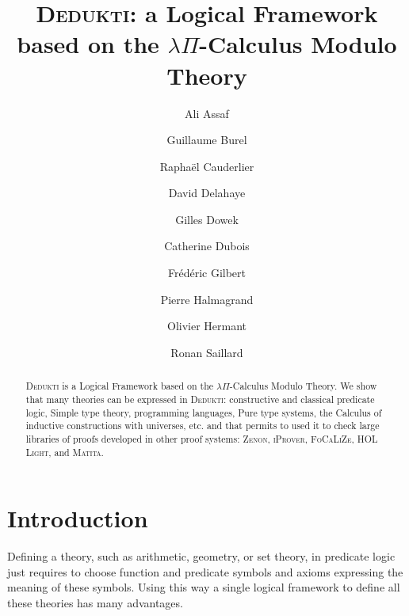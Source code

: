 \documentclass[english]{lipics}
\begin{document}
\title{
\textsc{Dedukti}: a Logical Framework based on the
$\lambda \Pi$-Calculus Modulo Theory}
\author[1]{Ali Assaf}
\author[2]{Guillaume Burel}
\author[3]{Rapha\"el Cauderlier}
\author[4]{David Delahaye}
\author[5]{Gilles Dowek}
\author[2]{Catherine Dubois}
\author[6]{Fr\'ed\'eric Gilbert}
\author[7]{Pierre Halmagrand}
\author[8]{Olivier Hermant}
\author[8]{Ronan Saillard}









\date{}
\maketitle
\thispagestyle{empty}

\begin{abstract}
\textsc{Dedukti} is a Logical Framework based on the $\lambda
\Pi$-Calculus Modulo Theory. We show that many theories can be
expressed in \textsc{Dedukti}: constructive and classical predicate
logic, Simple type theory, programming languages, Pure type systems,
the Calculus of inductive constructions with universes, etc. and that
permits to used it to check large libraries of proofs developed in
other proof systems: \textsc{Zenon}, \textsc{iProver},
\textsc{FoCaLiZe}, \textsc{HOL Light}, and \textsc{Matita}.
\end{abstract}

\section{Introduction}
\label{sec:intro}

Defining a theory, such as arithmetic, geometry, or set theory, in
predicate logic \cite{HilbertAckermann} just requires to choose
function and predicate symbols and axioms expressing the meaning of
these symbols. Using this way a single logical framework to define
all these theories has many advantages.
\end{document}
